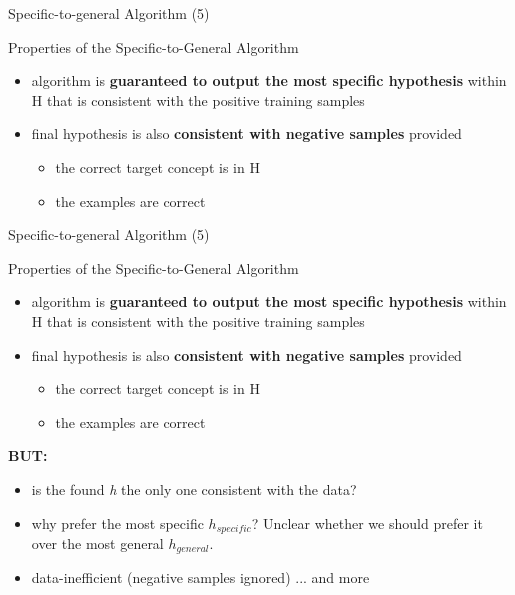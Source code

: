 \documentclass{beamer}
\begin{document}
\begin{frame}{Specific-to-general Algorithm (5)}
\begin{block}{Properties of the Specific-to-General Algorithm}
\begin{itemize}
\item algorithm is \textbf{guaranteed to output the most specific hypothesis} within H that is consistent with the positive training samples
\item final hypothesis is also \textbf{consistent with negative samples} provided
\begin{itemize}
\item the correct target concept is in H
\item the examples are correct
\end{itemize}
\end{itemize}
\end{block}
\end{frame}



\begin{frame}{Specific-to-general Algorithm (5)}
\begin{block}{Properties of the Specific-to-General Algorithm}
\begin{itemize}
\item algorithm is \textbf{guaranteed to output the most specific hypothesis} within H that is consistent with the positive training samples
\item final hypothesis is also \textbf{consistent with negative samples} provided
\begin{itemize}
\item the correct target concept is in H
\item the examples are correct
\end{itemize}
\end{itemize}
\end{block}
\textbf{BUT:}
\begin{itemize}
\item is the found \emph{h} the only one consistent with the data?
\item why prefer the most specific \emph{$h_{specific}$}? Unclear whether we should prefer it over the most general \emph{$h_{general}$}.
\item data-inefficient (negative samples ignored) ... and more
\end{itemize}
\end{frame}
\end{document}
